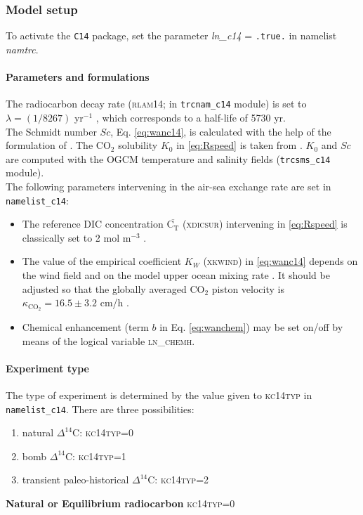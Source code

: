 \documentclass[../main/TOP_manual]{subfiles}
\newcommand{\cd}{\mathrm{CO_2}}
\newcommand{\Ct}{\mathrm{C_T}}
\newcommand{\Dcq}{\Delta ^{14}\mathrm{C}}
\newcommand{\CODE}[1]{\textsc{#1}}
\begin{document}

%
\subsubsection{Model setup}
\label{sec:setup}

To activate the \texttt{C14} package, set the parameter \textit{ln\_c14} = \texttt{.true.} in namelist \textit{namtrc}.

\paragraph{Parameters and formulations}
\label{sec:param}
The radiocarbon decay rate (\CODE{rlam14}; in \texttt{trcnam\_c14} module) is set to $\lambda=(1/8267)$ yr$^{-1}$ \citep{stuiver_1977}, which corresponds to a half-life of 5730 yr.\\[1pt]
%
The Schmidt number $Sc$, Eq. \eqref{eq:wanc14}, is calculated with the help of the formulation of \cite{wanninkhof_2014}. The $\cd$ solubility $K_0$ in \eqref{eq:Rspeed} is taken from \cite{weiss_1974}. $K_0$ and $Sc$ are computed with the OGCM temperature and salinity fields (\texttt{trcsms\_c14} module).\\[1pt]
%
The following parameters intervening in the air-sea exchange rate are set in \texttt{namelist\_c14}:
\begin{itemize}
\item The reference DIC concentration $\overline{\Ct}$ (\CODE{xdicsur}) intervening in \eqref{eq:Rspeed} is classically set to 2 mol m$^{-3}$ \citep{toggweiler_1989a,orr_2001,butzin_2005}.
%
\item The value of the empirical coefficient $K_W$ (\CODE{xkwind}) in \eqref{eq:wanc14} depends on the wind field and on the model upper ocean mixing rate \citep{toggweiler_1989a,wanninkhof_1992,naegler_2009,wanninkhof_2014}.
It should be adjusted so that the globally averaged $\cd$ piston velocity is $\kappa_\cd = 16.5\pm 3.2$ cm/h \citep{naegler_2009}.
%
\item Chemical enhancement (term $b$  in Eq. \ref{eq:wanchem}) may be set on/off by means of the logical variable \CODE{ln\_chemh}.
\end{itemize}

%
\paragraph{Experiment type}
The type of experiment is determined by the value given to \CODE{kc14typ} in \texttt{namelist\_c14}. There are three possibilities:
\begin{enumerate}
\item natural $\Dcq$: \CODE{kc14typ}=0
\item bomb $\Dcq$: \CODE{kc14typ}=1
\item transient paleo-historical $\Dcq$: \CODE{kc14typ}=2
\end{enumerate}
%
\textbf{Natural or Equilibrium radiocarbon}
\CODE{kc14typ}=0
\end{document}

